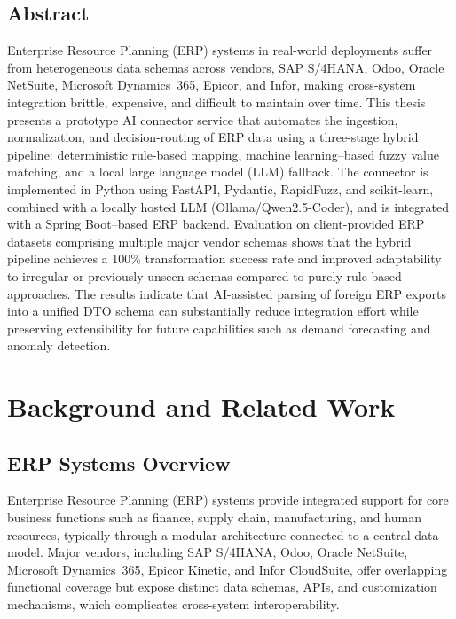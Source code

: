 \documentclass{article}
\begin{document}
\subsection*{Abstract}
Enterprise Resource Planning (ERP) systems in real-world deployments suffer from heterogeneous
data schemas across vendors, SAP S/4HANA, Odoo, Oracle NetSuite, Microsoft Dynamics~365,
Epicor, and Infor, making cross-system integration brittle, expensive, and difficult to
maintain over time.
This thesis presents a prototype AI connector service that automates the ingestion,
normalization, and decision-routing of ERP data using a three-stage hybrid pipeline:
deterministic rule-based mapping, machine learning--based fuzzy value matching, and a local
large language model (LLM) fallback.
The connector is implemented in Python using FastAPI, Pydantic, RapidFuzz, and scikit-learn,
combined with a locally hosted LLM (Ollama/Qwen2.5-Coder), and is integrated with a Spring
Boot--based ERP backend.
Evaluation on client-provided ERP datasets comprising multiple major vendor schemas shows that the
hybrid pipeline achieves a 100\% transformation success rate and improved adaptability to
irregular or previously unseen schemas compared to purely rule-based approaches.
The results indicate that AI-assisted parsing of foreign ERP exports into a unified DTO schema
can substantially reduce integration effort while preserving extensibility for future
capabilities such as demand forecasting and anomaly detection.

\section{Background and Related Work}

\subsection{ERP Systems Overview}
Enterprise Resource Planning (ERP) systems provide integrated support for core business
functions such as finance, supply chain, manufacturing, and human resources, typically through
a modular architecture connected to a central data model.\autocite{zhang2021aienterprise}
Major vendors, including SAP S/4HANA, Odoo, Oracle NetSuite, Microsoft Dynamics~365, Epicor
Kinetic, and Infor CloudSuite, offer overlapping functional coverage but expose distinct data
schemas, APIs, and customization mechanisms, which complicates cross-system
interoperability.\autocite{dataforest2026integration,nexla2024enterprise}
\end{document}
